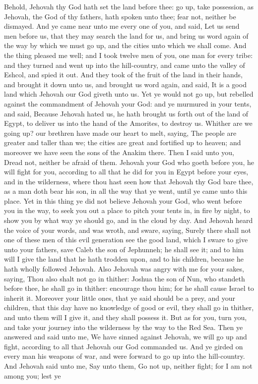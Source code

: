 Behold, Jehovah thy God hath set the land before thee: go up, take possession, as Jehovah, the God of thy fathers, hath spoken unto thee; fear not, neither be dismayed. And ye came near unto me every one of you, and said, Let us send men before us, that they may search the land for us, and bring us word again of the way by which we must go up, and the cities unto which we shall come. And the thing pleased me well; and I took twelve men of you, one man for every tribe: and they turned and went up into the hill-country, and came unto the valley of Eshcol, and spied it out. And they took of the fruit of the land in their hands, and brought it down unto us, and brought us word again, and said, It is a good land which Jehovah our God giveth unto us.  Yet ye would not go up, but rebelled against the commandment of Jehovah your God: and ye murmured in your tents, and said, Because Jehovah hated us, he hath brought us forth out of the land of Egypt, to deliver us into the hand of the Amorites, to destroy us. Whither are we going up? our brethren have made our heart to melt, saying, The people are greater and taller than we; the cities are great and fortified up to heaven; and moreover we have seen the sons of the Anakim there. Then I said unto you, Dread not, neither be afraid of them. Jehovah your God who goeth before you, he will fight for you, according to all that he did for you in Egypt before your eyes, and in the wilderness, where thou hast seen how that Jehovah thy God bare thee, as a man doth bear his son, in all the way that ye went, until ye came unto this place. Yet in this thing ye did not believe Jehovah your God, who went before you in the way, to seek you out a place to pitch your tents in, in fire by night, to show you by what way ye should go, and in the cloud by day.  And Jehovah heard the voice of your words, and was wroth, and sware, saying, Surely there shall not one of these men of this evil generation see the good land, which I sware to give unto your fathers, save Caleb the son of Jephunneh; he shall see it; and to him will I give the land that he hath trodden upon, and to his children, because he hath wholly followed Jehovah. Also Jehovah was angry with me for your sakes, saying, Thou also shalt not go in thither: Joshua the son of Nun, who standeth before thee, he shall go in thither: encourage thou him; for he shall cause Israel to inherit it. Moreover your little ones, that ye said should be a prey, and your children, that this day have no knowledge of good or evil, they shall go in thither, and unto them will I give it, and they shall possess it. But as for you, turn you, and take your journey into the wilderness by the way to the Red Sea.  Then ye answered and said unto me, We have sinned against Jehovah, we will go up and fight, according to all that Jehovah our God commanded us. And ye girded on every man his weapons of war, and were forward to go up into the hill-country. And Jehovah said unto me, Say unto them, Go not up, neither fight; for I am not among you; lest ye 